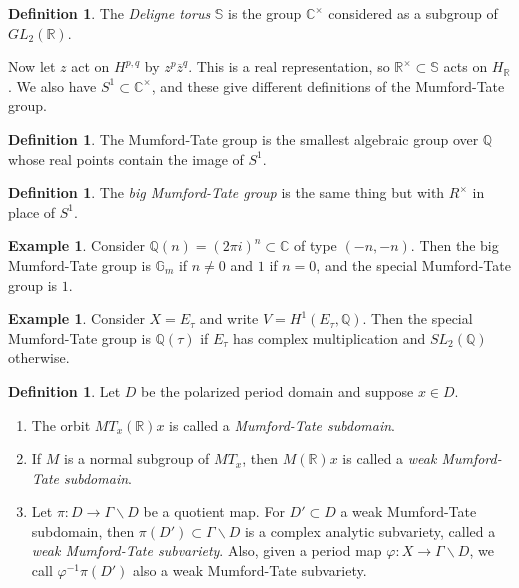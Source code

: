 \documentclass[leqno, openany]{memoir}
\theoremstyle{definition}
\newtheorem{defn}[thm]{Definition}
\newtheorem{exm}[thm]{Example}
\theoremstyle{remark}
\theoremstyle{plain}
\theoremstyle{definition}
\theoremstyle{remark}
\newcommand{\R}{\mathbb{R}}
\newcommand{\C}{\mathbb{C}}
\newcommand{\Q}{\mathbb{Q}}
\newcommand{\ol}[1]{\overline{#1}}
\begin{document}
\begin{defn}
    The \textit{Deligne torus} $\mathbb{S}$ is the group $\C^{\times}$ considered as a subgroup of $GL_2(\R)$.
\end{defn}

Now let $z$ act on $H^{p,q}$ by $z^p \ol{z}^q$. This is a real representation, so $\R^{\times} \subset \mathbb{S}$ acts on $H_{\R}$. We also have $S^1 \subset \C^{\times}$, and these give different definitions of the Mumford-Tate group.

\begin{defn}
    The Mumford-Tate group is the smallest algebraic group over $\Q$ whose real points contain the image of $S^1$.
\end{defn}

\begin{defn}
    The \textit{big Mumford-Tate group} is the same thing but with $R^{\times}$ in place of $S^1$.
\end{defn}

\begin{exm}
    Consider $\Q(n) = (2 \pi i)^n \subset \C$ of type $(-n, -n)$. Then the big Mumford-Tate group is $\mathbb{G}_m$ if $n \neq 0$ and $\qty{1}$ if $n = 0$, and the special Mumford-Tate group is $\qty{1}$.
\end{exm}

\begin{exm}
    Consider $X = E_{\tau}$ and write $V = H^1(E_{\tau}, \Q)$. Then the special Mumford-Tate group is $\Q(\tau)$ if $E_{\tau}$ has complex multiplication and $SL_2(\Q)$ otherwise.
\end{exm}

\begin{defn}
    Let $D$ be the polarized period domain and suppose $x \in D$.
    \begin{enumerate}
        \item The orbit $MT_x(\R) x$ is called a \textit{Mumford-Tate subdomain}.
        \item If $M$ is a normal subgroup of $MT_x$, then $M(\R) x$ is called a \textit{weak Mumford-Tate subdomain}.
        \item Let $\pi \colon D \to \Gamma \backslash D$ be a quotient map. For $D' \subset D$ a weak Mumford-Tate subdomain, then $\pi(D') \subset \Gamma \backslash D$ is a complex analytic subvariety, called a \textit{weak Mumford-Tate subvariety}. Also, given a period map $\varphi \colon X \to \Gamma \backslash D$, we call $\varphi^{-1} \pi(D')$ also a weak Mumford-Tate subvariety.
    \end{enumerate}
\end{defn}
\end{document}
